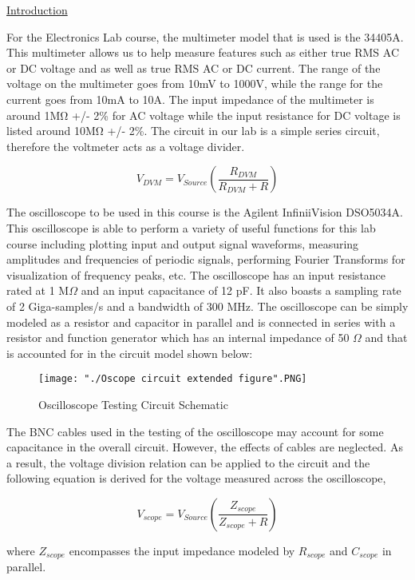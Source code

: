 \documentclass[a4paper,10pt]{article}
\begin{document}
	
\underline{Introduction}

For the Electronics Lab course, the multimeter model that is used is the 34405A. This multimeter allows us to help measure features such as either true RMS AC or DC voltage and as well as true RMS AC or DC current. The range of the voltage on the multimeter goes from 10mV to 1000V, while the range for the current goes from 10mA to 10A. The input impedance of the multimeter is around 1M\si{\ohm} +/- 2\% for AC voltage while the input resistance for DC voltage is listed around 10M\si{\ohm} +/- 2\%. The circuit in our lab is a simple series circuit, therefore the voltmeter acts as a voltage divider.

\begin{equation}
	\label{eq:vdvm}
	V_{DVM} = V_{Source}(\frac{R_{DVM}}{R_{DVM} + R}) 
\end{equation}

The oscilloscope to be used in this course is the Agilent InfiniiVision DSO5034A. This oscilloscope is able to perform a variety of useful functions for this lab course including plotting input and output signal waveforms, measuring amplitudes and frequencies of periodic signals, performing Fourier Transforms for visualization of frequency peaks, etc. The oscilloscope has an input resistance rated at 1 M$\Omega$ and an input capacitance of 12 pF. It also boasts a sampling rate of 2 Giga-samples/s and a bandwidth of 300 MHz. The oscilloscope can be simply modeled as a resistor and capacitor in parallel and is connected in series with a resistor and function generator which has an internal impedance of 50 $\Omega$ and that is accounted for in the circuit model shown below: 

\begin{figure}[h!]
	\centering
	\texttt{[image: "./Oscope circuit extended figure".PNG]}
	\caption{Oscilloscope Testing Circuit Schematic}
	\label{fig:scope_circuit}
\end{figure}


The BNC cables used in the testing of the oscilloscope may account for some capacitance in the overall circuit. However, the effects of cables are neglected. As a result, the voltage division relation can be applied to the circuit and the following equation is derived for the voltage measured across the oscilloscope,

\begin{equation}
	\label{eq:vscope}
	V_{scope} = V_{Source}(\frac{Z_{scope}}{Z_{scope} + R}) 
\end{equation}
	
where $Z_{scope}$ encompasses the input impedance modeled by $R_{scope}$ and $C_{scope}$ in parallel. 
	
	
	
	
	
\end{document}
